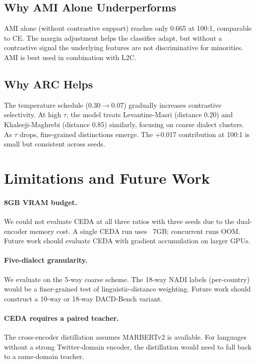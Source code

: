 \documentclass[11pt,a4paper,twocolumn]{article}
\newcommand{\method}{L2C}
\newcommand{\bench}{DACD-Bench}
\newcommand{\ceda}{CEDA}
\newcommand{\ami}{AMI}
\newcommand{\arc}{ARC}
\begin{document}
\subsection{Why \ami{} Alone Underperforms}
\ami{} alone (without contrastive support) reaches only 0.665 at
100:1, comparable to CE. The margin adjustment helps the classifier
adapt, but without a contrastive signal the underlying features are
not discriminative for minorities. \ami{} is best used in
combination with \method{}.

\subsection{Why \arc{} Helps}
The temperature schedule (0.30$\to$0.07) gradually increases
contrastive selectivity. At high $\tau$, the model treats
Levantine-Masri (distance 0.20) and Khaleeji-Maghrebi (distance
0.85) similarly, focusing on coarse dialect clusters. As
$\tau$ drops, fine-grained distinctions emerge. The
+0.017 contribution at 100:1 is small but consistent across
seeds.

\section{Limitations and Future Work}
\paragraph{8GB VRAM budget.}
We could not evaluate \ceda{} at all three ratios with three seeds
due to the dual-encoder memory cost. A single CEDA run uses
~7GB; concurrent runs OOM. Future work should evaluate CEDA with
gradient accumulation on larger GPUs.

\paragraph{Five-dialect granularity.}
We evaluate on the 5-way coarse scheme. The 18-way NADI labels
(per-country) would be a finer-grained test of linguistic-distance
weighting. Future work should construct a 10-way or 18-way
\bench{} variant.

\paragraph{\ceda{} requires a paired teacher.}
The cross-encoder distillation assumes MARBERTv2 is available.
For languages without a strong Twitter-domain encoder, the
distillation would need to fall back to a same-domain teacher.
\end{document}
